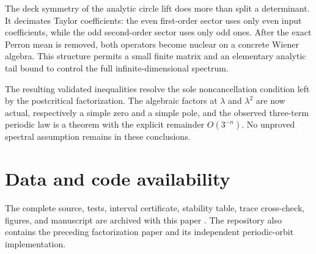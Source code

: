 \documentclass[11pt]{article}
\theoremstyle{definition}
\theoremstyle{remark}
\begin{document}
The deck symmetry of the analytic circle lift does more than split a
determinant.  It decimates Taylor coefficients: the even first-order sector
uses only even input coefficients, while the odd second-order sector uses
only odd ones.  After the exact Perron mean is removed, both operators become
nuclear on a concrete Wiener algebra.  This structure permits a
small finite matrix and an elementary analytic tail bound to control the full
infinite-dimensional spectrum.

The resulting validated inequalities resolve the sole noncancellation
condition left by the postcritical factorization.  The algebraic factors at
$\lambda$ and $\lambda^2$ are now actual, respectively a simple zero and a
simple pole, and the observed three-term periodic law is a theorem with the
explicit remainder $O(3^{-n})$.  No unproved spectral assumption remains in
these conclusions.

\section*{Data and code availability}

The complete source, tests, interval certificate, stability table, trace
cross-check, figures, and manuscript are archived with this paper
\citep{WangValidatedGapCode2026}.  The repository also contains the preceding
factorization paper and its independent periodic-orbit implementation.



\end{document}

